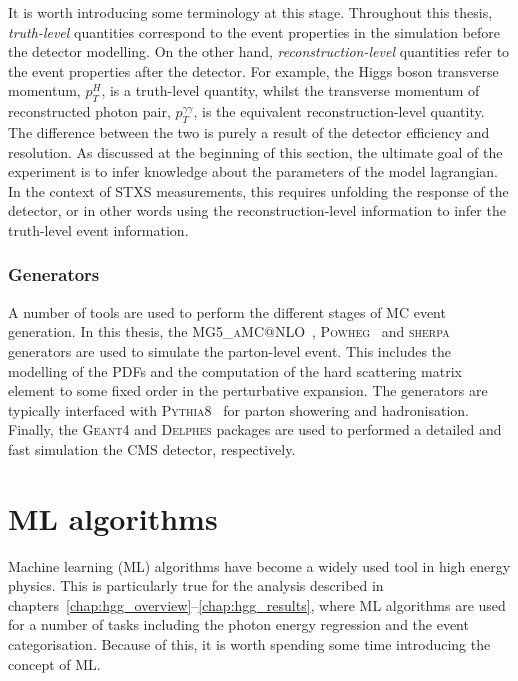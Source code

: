 It is worth introducing some terminology at this stage. Throughout this thesis, \textit{truth-level} quantities correspond to the event properties in the simulation before the detector modelling. On the other hand, \textit{reconstruction-level} quantities refer to the event properties after the detector. For example, the Higgs boson transverse momentum, $p_T^H$, is a truth-level quantity, whilst the transverse momentum of reconstructed photon pair, $p_T^{\gamma\gamma}$, is the equivalent reconstruction-level quantity. The difference between the two is purely a result of the detector efficiency and resolution. As discussed at the beginning of this section, the ultimate goal of the experiment is to infer knowledge about the parameters of the model lagrangian. In the context of STXS measurements, this requires unfolding the response of the detector, or in other words using the reconstruction-level information to infer the truth-level event information.

\subsubsection{Generators}
A number of tools are used to perform the different stages of MC event generation. In this thesis, the \textsc{MG5\_aMC@NLO}~\cite{Alwall:2014hca}, \textsc{Powheg}~\cite{Nason:2004rx,Frixione:2007vw,Alioli:2008tz,Nason:2009ai,Alioli:2010xd,Hartanto:2015uka} and \textsc{sherpa}~\cite{Gleisberg:2008ta} generators are used to simulate the parton-level event. This includes the modelling of the PDFs and the computation of the hard scattering matrix element to some fixed order in the perturbative expansion. The generators are typically interfaced with \textsc{Pythia8}~\cite{Sjostrand:2014zea} for parton showering and hadronisation. Finally, the \textsc{Geant4} and \textsc{Delphes} packages are used to performed a detailed and fast simulation the CMS detector, respectively.

\section{ML algorithms}\label{sec:ml_algo}
Machine learning (ML) algorithms have become a widely used tool in high energy physics. This is particularly true for the \Hgg analysis described in chapters~\ref{chap:hgg_overview}--\ref{chap:hgg_results}, where ML algorithms are used for a number of tasks including the photon energy regression and the event categorisation. Because of this, it is worth spending some time introducing the concept of ML. 

